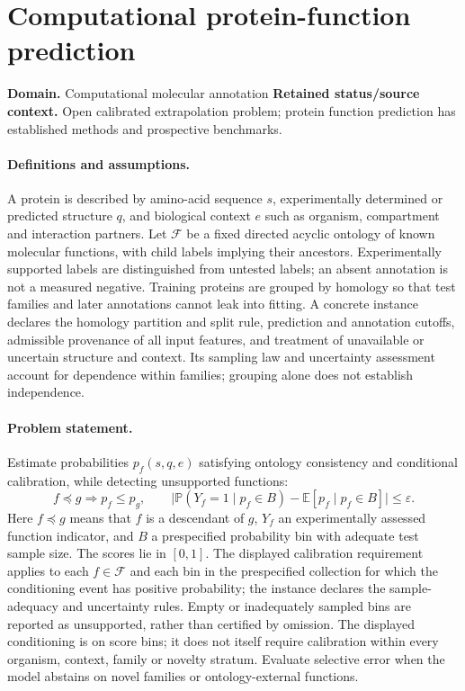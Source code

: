 \documentclass[11pt]{article}
\begin{document}
\section*{Computational protein-function prediction}
\label{prob:061}
\label{rank:130}
\par\smallskip

\noindent\textbf{Domain.} Computational molecular annotation \quad \textbf{Retained status/source context.} Open calibrated extrapolation problem; protein function prediction has established methods and prospective benchmarks.
\paragraph{Definitions and assumptions.} A protein is described by amino-acid sequence $s$, experimentally determined or predicted structure $q$, and biological context $e$ such as organism, compartment and interaction partners. Let $\mathcal F$ be a fixed directed acyclic ontology of known molecular functions, with child labels implying their ancestors. Experimentally supported labels are distinguished from untested labels; an absent annotation is not a measured negative. Training proteins are grouped by homology so that test families and later annotations cannot leak into fitting. A concrete instance declares the homology partition and split rule, prediction and annotation cutoffs, admissible provenance of all input features, and treatment of unavailable or uncertain structure and context. Its sampling law and uncertainty assessment account for dependence within families; grouping alone does not establish independence.
\paragraph{Problem statement.} Estimate probabilities $p_f(s,q,e)$ satisfying ontology consistency and conditional calibration, while detecting unsupported functions:
\[f\preceq g\Longrightarrow p_f\le p_g,\qquad \big|\mathbb{P}(Y_f=1\mid p_f\in B)-\mathbb{E}[p_f\mid p_f\in B]\big|\le\varepsilon.\]
Here $f\preceq g$ means that $f$ is a descendant of $g$, $Y_f$ an experimentally assessed function indicator, and $B$ a prespecified probability bin with adequate test sample size. The scores lie in $[0,1]$. The displayed calibration requirement applies to each $f\in\mathcal F$ and each bin in the prespecified collection for which the conditioning event has positive probability; the instance declares the sample-adequacy and uncertainty rules. Empty or inadequately sampled bins are reported as unsupported, rather than certified by omission. The displayed conditioning is on score bins; it does not itself require calibration within every organism, context, family or novelty stratum. Evaluate selective error when the model abstains on novel families or ontology-external functions.
\end{document}
